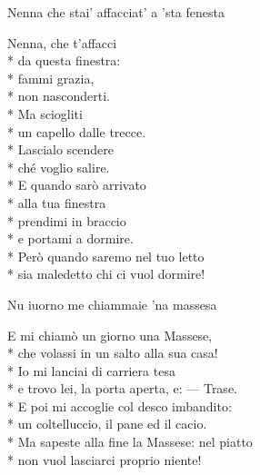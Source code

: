 \documentclass[11pt]{book}
\begin{document}
\begin{poem}{Nenna che stai’ affacciat’ a ’sta fenesta}{}
\settowidth{\versewidth}{Sia maledetto chi ci vuol dormire}
\begin{altverse}
Nenna, che t’affacci\\*
da questa finestra:\\*
fammi grazia,\\*
non nasconderti.\\*
Ma sciogliti\\*
un capello dalle trecce.\\*
Lascialo scendere\\*
ché voglio salire.\\*
E quando sarò arrivato\\*
alla tua finestra\\*
prendimi in braccio\\*
e portami a dormire.\\*
Però quando saremo nel tuo letto\\*
sia maledetto chi ci vuol dormire!
\end{altverse}
\end{poem}

\begin{poem}{Nu iuorno me chiammaie ’na massesa}{}
\settowidth{\versewidth}{Ma sapeste alla fine la Massese: nel piatto}
\begin{altverse}
E mi chiamò un giorno una Massese,\\*
che volassi in un salto alla sua casa!\\*
Io mi lanciai di carriera tesa\\*
e trovo lei, la porta aperta, e: — Trase.\\*
E poi mi accoglie col desco imbandito:\\*
un coltelluccio, il pane ed il cacio.\\*
Ma sapeste alla fine la Massese: nel piatto\\*
non vuol lasciarci proprio niente!
\end{altverse}
\end{poem}
\end{document}
